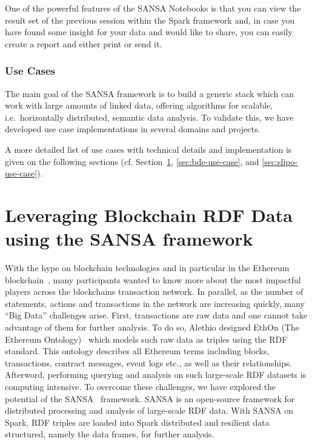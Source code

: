 One of the powerful features of the SANSA Notebooks is that you can view the result set of the previous session within the Spark framework and, in case you have found some insight for your data and would like to share, you can easily create a report and either print or send it.


\subsubsection{Use Cases}
The main goal of the SANSA framework is to build a generic stack which can work with large amounts of linked data, offering algorithms for scalable, i.e.~horizontally distributed, semantic data analysis.
To validate this, we have developed use case implementations in several domains and projects.
   
A more detailed list of use cases with technical details and implementation is given on the following sections (cf. Section~\ref{sec:alethio-use-case}, \ref{sec:bde-use-case}, and \ref{sec:slipo-use-case}).

\section{Leveraging Blockchain RDF Data using the SANSA framework}
\label{sec:alethio-use-case}
With the hype on blockchain technologies and in particular in the Ethereum blockchain~\cite{wood2014ethereum}, many participants wanted to know more about the most impactful players across the blockchains transaction network.
In parallel, as the number of statements, actions and transactions in the network are increasing quickly, many ``Big Data'' challenges arise.
First, transactions are raw data and one cannot take advantage of them for further analysis.
To do so, Alethio designed EthOn (The Ethereum Ontology)~\cite{pfeffer2016ethon} which models such raw data as triples using the \gls{RDF} standard.
This ontology describes all Ethereum terms including blocks, transactions, contract messages, event logs etc., as well as their relationships.
Afterword, performing querying and analysis on such large-scale RDF datasets is computing intensive.
To overcome these challenges, we have explored the potential of the SANSA~\cite{lehmann-2017-sansa-iswc} framework.
SANSA is an open-source framework for distributed processing and analysis of large-scale RDF data.
With SANSA on Spark, \gls{RDF} triples are loaded into Spark distributed and resilient data structured, namely the data frames, for further analysis.

